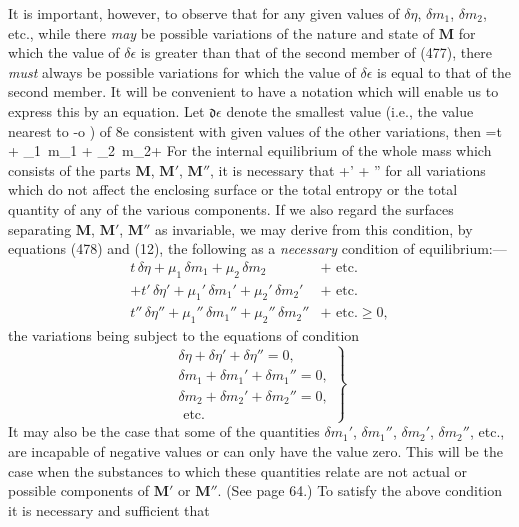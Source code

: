 \documentclass[12pt]{memoir}
\newcommand{\dd}{\delta}
\newcommand{\ddd}{\mathfrak{d}}
\begin{document}
{It is important, however, to observe that for any given values of $\delta \eta$, $\delta m_1$, $\delta m_2$, etc., while there \textit{may} be possible variations of the nature and state of $\mathbf{M}$ for which the value of $\delta \epsilon$ is greater than that of the second member of (477), there \textit{must} always be possible variations for which the value of $\delta \epsilon$ is equal to that of the second member. It will be convenient to have a notation which will enable us to express this by an equation. Let $\ddd \epsilon$ denote the smallest value (i.e., the value nearest to -o ) of 8e consistent with given values of the other variations, then
\eqs \dd \epsilon =t \,\dd \eta+ \mu_1 \,\dd m_1 + \mu_2 \,\dd m_2+ \label{478} \eqe
For the internal equilibrium of the whole mass which consists of
the parts $\mathbf{M}$, $\mathbf{M}'$, $\mathbf{M}''$, it is necessary that
\eqs \dd \epsilon +\dd \epsilon' +  \dd \epsilon'' \label{479} \eqe
for all variations which do not affect the enclosing surface or the total entropy or the total quantity of any of the various components. If we also regard the surfaces separating $\mathbf{M}$, $\mathbf{M}'$, $\mathbf{M}''$ as invariable, we may derive from this condition, by equations (478) and (12), the following as a \textit{necessary} condition of equilibrium:---
\begin{align}
t \, \dd \eta +\mu_1 \,\dd m_1 + \mu_2 \,\dd m_2 &+ \text{ etc.} \nonumber \\
+ t' \, \dd \eta' +\mu_1' \,\dd m_1' + \mu_2' \,\dd m_2' &+ \text{ etc.} \nonumber \\
 t'' \, \dd \eta'' +\mu_1'' \,\dd m_1'' + \mu_2'' \,\dd m_2'' &+ \text{ etc.}  \geq 0,  \label{480} \end{align}
the variations being subject to the equations of condition
\begin{equation}\left.\begin{array}{r}
\dd \eta + \dd\eta' +\dd\eta'' = 0, \\
\dd m_1 + \dd m_1' +\dd m_1'' = 0,   \\
\dd m_2 + \dd m_2' +\dd m_2'' = 0, \\
\text{ etc.} \end{array} \label{481} \right\} \end{equation}
It may also be the case that some of the quantities $\dd m_1'$, $\dd m_1''$, $\dd m_2'$, $\dd m_2''$, etc., are incapable of negative values or can only have the value zero. This will be the case when the substances to which these quantities relate are not actual or possible components of $\mathbf{M}'$ or $\mathbf{M}''$. (See page 64.) To satisfy the above condition it is necessary and sufficient that
}
\end{document}
